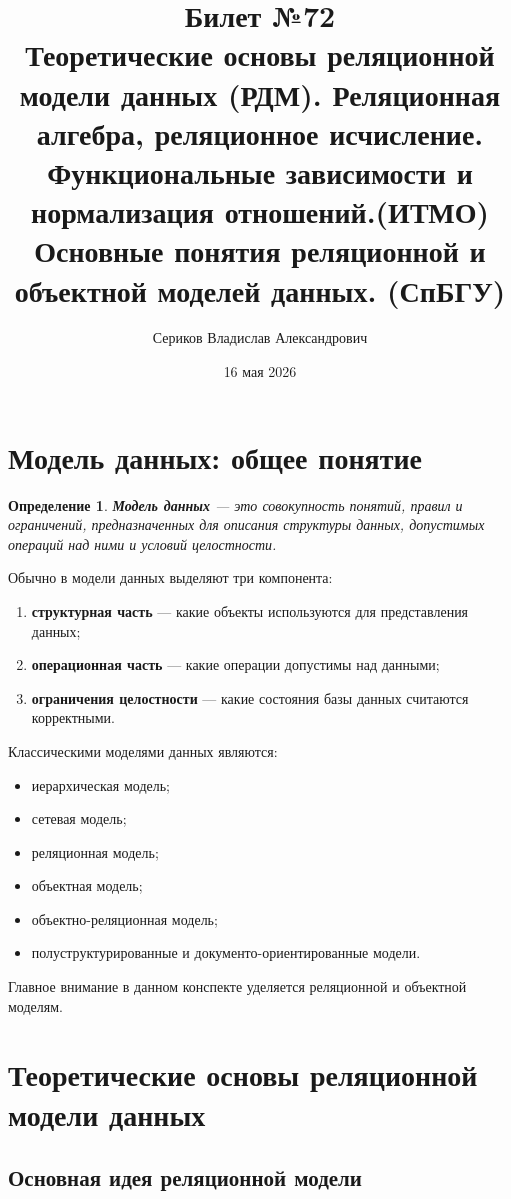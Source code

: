 \documentclass[12pt,a4paper]{article}
\title{Билет №72 \\ \small Теоретические основы реляционной модели данных (РДМ). Реляционная алгебра, реляционное исчисление. Функциональные зависимости и нормализация отношений.(ИТМО) \\ Основные понятия реляционной и объектной моделей данных. (СпБГУ)}
\author{Сериков Владислав Александрович}
\date{16 мая 2026}
\newtheorem{definition}{Определение}[section]
\theoremstyle{remark}
\begin{document}
\maketitle
\tableofcontents
\newpage

\section{Модель данных: общее понятие}

\begin{definition}
\textbf{Модель данных} --- это совокупность понятий, правил и ограничений, предназначенных для описания структуры данных, допустимых операций над ними и условий целостности.
\end{definition}

Обычно в модели данных выделяют три компонента:
\begin{enumerate}
    \item \textbf{структурная часть} --- какие объекты используются для представления данных;
    \item \textbf{операционная часть} --- какие операции допустимы над данными;
    \item \textbf{ограничения целостности} --- какие состояния базы данных считаются корректными.
\end{enumerate}

Классическими моделями данных являются:
\begin{itemize}
    \item иерархическая модель;
    \item сетевая модель;
    \item реляционная модель;
    \item объектная модель;
    \item объектно-реляционная модель;
    \item полуструктурированные и документо-ориентированные модели.
\end{itemize}

Главное внимание в данном конспекте уделяется реляционной и объектной моделям.

\section{Теоретические основы реляционной модели данных}

\subsection{Основная идея реляционной модели}
\end{document}
